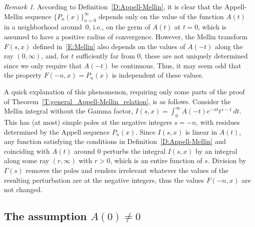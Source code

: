\documentclass[11pt,a4paper]{amsart}
\theoremstyle{plain}
\theoremstyle{plain}
\theoremstyle{definition}
\theoremstyle{remark}
\newtheorem*{remark}{Remark}
\begin{document}
\begin{remark}
According to Definition~\ref{D:Appell-Mellin}, it is clear that the Appell-Mellin sequence $\{P_{n}(x)\}_{n=0}^{\infty}$ depends only on the value of the function $A(t)$ in a neighborhood around~$0$, i.e., on the germ of $A(t)$ at $t=0$, which is assumed to have a positive radius of convergence. However, the Mellin transform $F(s,x)$ defined in~\eqref{E:Mellin} also depends on the values of $A(-t)$ along the ray $(0,\infty)$, and, for $t$ sufficiently far from $0$, these are not uniquely determined since we only require that $A(-t)$ be continuous. Thus, it may seem odd that the property $F(-n,x) = P_n(x)$ is independent of these values.

A quick explanation of this phenomenon, requiring only some parts of the proof of Theorem~\ref{T:general_Appell-Mellin_relation}, is as follows. Consider the Mellin integral without the Gamma factor, $I(s,x) = \int_{0}^{\infty} A(-t) e^{-xt} t^{s-1}\,dt$. This has (at most) simple poles at the negative integers $s=-n$, with residues determined by the Appell sequence $P_{n}(x)$. Since $I(s,x)$ is linear in $A(t)$, any function satisfying the conditions in Definition~\ref{D:Appell-Mellin} and coinciding with $A(t)$ around $0$ perturbs the integral $I(s,x)$ by an integral along some ray $(r,\infty)$ with $r>0$, which is an entire function of $s$. Division by $\Gamma(s)$ removes the poles and renders irrelevant whatever the values of the resulting perturbation are at the negative integers, thus the values $F(-n,x)$ are not changed.
\end{remark}


\subsection{The assumption $A(0) \neq 0$}
\label{subsec:a(0)_neq_0}
\end{document}
